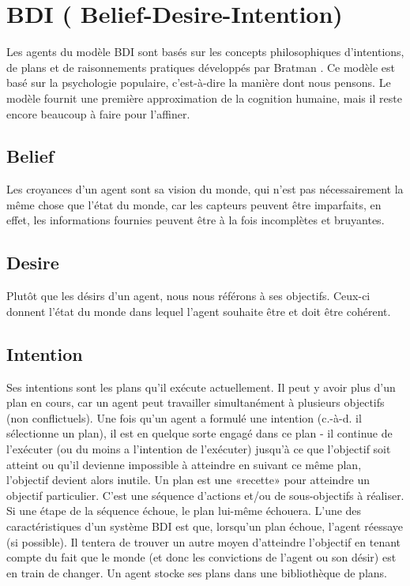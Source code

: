 \section{BDI ( Belief-Desire-Intention)}

Les agents du modèle BDI sont basés sur les concepts philosophiques d'intentions, de plans et de raisonnements pratiques développés par Bratman \parencite{bratman1987intention}. Ce modèle est basé sur la psychologie populaire, c'est-à-dire la manière dont nous pensons. Le modèle fournit une première approximation de la cognition humaine, mais il reste encore beaucoup à faire pour l’affiner.


\subsection{Belief}

Les croyances d'un agent sont sa vision du monde, qui n'est pas nécessairement la même chose que l'état du monde, car les capteurs peuvent être imparfaits, en effet, les informations fournies peuvent être à la fois incomplètes et bruyantes.

\subsection{Desire}

Plutôt que les désirs d’un agent, nous nous référons à ses objectifs. Ceux-ci donnent l'état du monde dans lequel l'agent souhaite être et doit être cohérent.


\subsection{Intention}

Ses intentions sont les plans qu'il exécute actuellement. Il peut y avoir plus d'un plan en cours, car un agent peut travailler simultanément à plusieurs objectifs (non conflictuels). Une fois qu'un agent a formulé une intention (c.-à-d. il sélectionne un plan), il est en quelque sorte engagé dans ce plan - il continue de l'exécuter (ou du moins a l'intention de l'exécuter) jusqu'à ce que l'objectif soit atteint ou qu’il devienne impossible à atteindre en suivant ce même plan, l'objectif devient alors inutile. 
Un plan est une «recette» pour atteindre un objectif particulier. C'est une séquence d'actions et/ou de sous-objectifs à réaliser. Si une étape de la séquence échoue, le plan lui-même échouera. L'une des caractéristiques d'un système BDI est que, lorsqu'un plan échoue, l'agent réessaye (si possible). Il tentera de trouver un autre moyen d’atteindre l’objectif en tenant compte du fait que le monde (et donc les convictions de l’agent ou son désir) est en train de changer. Un agent stocke ses plans dans une bibliothèque de plans.


